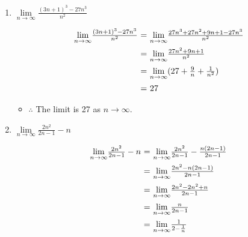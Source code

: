 \documentclass[12pt]{report}
\begin{document}
\begin{enumerate}[leftmargin=\labelsep]
\begin{enumerate}
\begin{tcolorbox}
                \end{tcolorbox}
            \item $\lim \limits_{n\rightarrow \infty} \frac{(3n+1)^3-27n^3}{n^2}$
                \begin{tcolorbox}
                    \begin{equation*}
                        \begin{array}{r@{~=~}l}
                            {\lim \limits_{{n\rightarrow \infty}}} \frac{(3n+1)^3-27n^3}{n^2} & {\lim \limits_{{n\rightarrow \infty}}} \frac{27n^3+27n^2+9n+1-27n^3}{n^2} \\ [2ex]
                            & {\lim \limits_{{n\rightarrow \infty}}} \frac{27n^2+9n+1}{n^2} \\ [2ex]
                            & {\lim \limits_{{n\rightarrow \infty}}} (27+\frac{9}{n}+\frac{1}{n^2}) \\ [2ex]
                            & 27
                        \end{array}
                    \end{equation*}
                    \begin{itemize}[label={}]
                        \item $\therefore$ The limit is 27 as $n \rightarrow \infty$.
                    \end{itemize}
                \end{tcolorbox}
\newpage
            \item $\lim \limits_{n\rightarrow \infty} \frac{2n^2}{2n-1}-n$
                \begin{tcolorbox}
                    \begin{equation*}
                        \begin{array}{r@{~=~}l}
                            {\lim \limits_{{n\rightarrow \infty}}} \frac{2n^2}{2n-1}-n & {\lim \limits_{{n\rightarrow \infty}}} \frac{2n^2}{2n-1}-\frac{n(2n-1)}{2n-1} \\ [2ex]
                            & {\lim \limits_{{n\rightarrow \infty}}} \frac{2n^2-n(2n-1)}{2n-1} \\ [2ex]
                            & {\lim \limits_{{n\rightarrow \infty}}} \frac{2n^2-2n^2+n}{2n-1} \\ [2ex]
                            & {\lim \limits_{{n\rightarrow \infty}}} \frac{n}{2n-1} \\ [2ex]
                            & {\lim \limits_{{n\rightarrow \infty}}} \frac{1}{2-\frac{1}{n}} \\ [2ex]

\end{array}
\end{equation*}
\end{tcolorbox}
\end{enumerate}
\end{enumerate}
\end{document}
